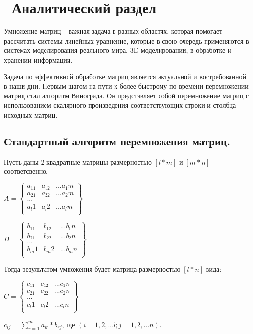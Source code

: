 \chapter{ Аналитический раздел}
\label{cha:analysis}

Умножение матриц -- важная задача в разных областях, которая помогает рассчитать системы линейных уравнение, которые в свою очередь применяются в системах моделирования реального мира, 3D моделировании, в обработке и хранении информации. 

Задача по эффективной обработке матриц является актуальной и востребованной в наши дни. Первым шагом на пути к более быстрому по времени перемножении матриц стал алгоритм Винограда. Он представляет собой перемножение матриц с использованием скалярного произведения соответствующих строки и столбца исходных матриц.

\section{ Стандартный алгоритм перемножения матриц.}
Пусть даны 2 квадратные матрицы размерностью $[l * m]$ и $[m * n]$ соответсвенно.

$
A = 
\begin{Bmatrix}
	a_11& a_12& ...   a_1m \\
	a_21& a_22& ...   a_2m \\
	...\\
	a_l1& a_l2& ...   a_lm \\
\end{Bmatrix}
$

$
B = 
\begin{Bmatrix}
	b_11& b_12& ...   b_1n \\
	b_21& b_22& ...   b_2n \\
	...\\
	b_m1& b_m2& ...   b_mn \\
\end{Bmatrix}
$


Тогда результатом умножения будет матрица размерностью $[l * n]$ вида:


$
C = 
\begin{Bmatrix}
	c_11& c_12& ...   c_1n \\
	c_21& c_22& ...   c_2n \\
	...\\
	c_l1& c_l2& ...   c_ln \\
\end{Bmatrix}
$

$c_{ij} = \sum_{r=1}^m a_{ir} * b_{rj}$, где $(i = 1, 2, ... l; j = 1, 2, ... n)$.


